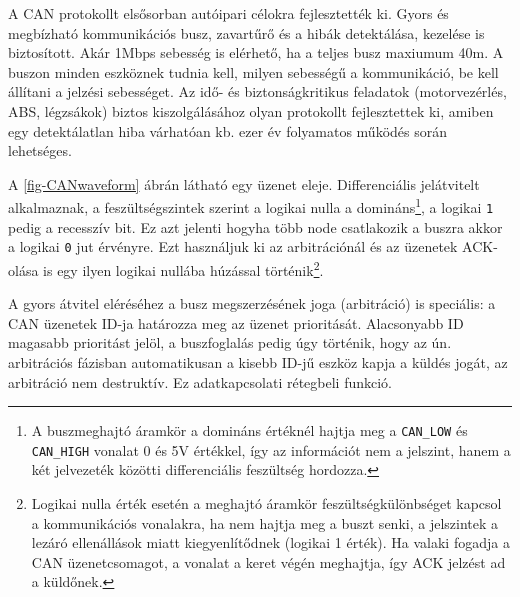 	A CAN protokollt elsősorban autóipari célokra fejlesztették ki. Gyors és megbízható kommunikációs busz, zavartűrő és a hibák detektálása, kezelése is biztosított. Akár 1Mbps sebesség is elérhető, ha a teljes busz maxiumum 40m. A buszon minden eszköznek tudnia kell, milyen sebességű a kommunikáció, be kell állítani a jelzési sebességet. Az idő- és biztonságkritikus feladatok (motorvezérlés, ABS, légzsákok) biztos kiszolgálásához olyan protokollt fejlesztettek ki, amiben egy detektálatlan hiba várhatóan kb. ezer év folyamatos működés során lehetséges.
	
	A \ref{fig-CANwaveform} ábrán látható egy üzenet eleje. Differenciális jelátvitelt alkalmaznak, a feszültségszintek szerint a logikai nulla a domináns\footnote{A buszmeghajtó áramkör a domináns értéknél hajtja meg a \texttt{CAN\_LOW} és \texttt{CAN\_HIGH} vonalat 0 és 5V értékkel, így az információt nem a jelszint, hanem a két jelvezeték közötti differenciális feszültség hordozza.}, a logikai \texttt{1} pedig a recesszív bit. Ez azt jelenti hogyha több node csatlakozik a buszra akkor a logikai \texttt{0} jut érvényre. Ezt használjuk ki az arbitrációnál és az üzenetek ACK-olása is egy ilyen logikai nullába húzással történik\footnote{Logikai nulla érték esetén a meghajtó áramkör feszültségkülönbséget kapcsol a kommunikációs vonalakra, ha nem hajtja meg a buszt senki, a jelszintek a lezáró ellenállások miatt kiegyenlítődnek (logikai 1 érték). Ha valaki fogadja a CAN üzenetcsomagot, a vonalat a keret végén meghajtja, így ACK jelzést ad a küldőnek.}.
		
	A gyors átvitel eléréséhez a busz megszerzésének joga (arbitráció) is speciális: a CAN üzenetek ID-ja határozza meg az üzenet prioritását. Alacsonyabb ID magasabb prioritást jelöl, a buszfoglalás pedig úgy történik, hogy az ún. arbitrációs fázisban automatikusan a kisebb ID-jű eszköz kapja a küldés jogát, az arbitráció nem destruktív. Ez adatkapcsolati rétegbeli funkció. %
		


